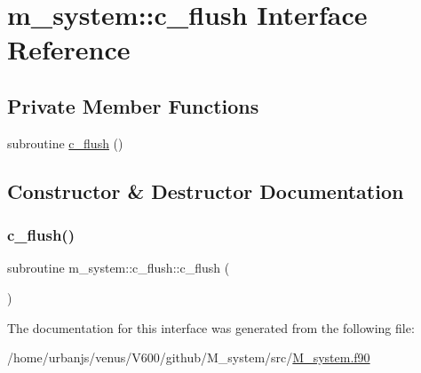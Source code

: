 \hypertarget{interfacem__system_1_1c__flush}{}\section{m\+\_\+system\+:\+:c\+\_\+flush Interface Reference}
\label{interfacem__system_1_1c__flush}
\subsection*{Private Member Functions}
\begin{DoxyCompactItemize}
\item 
subroutine \mbox{\hyperlink{interfacem__system_1_1c__flush_a617b08895c68af8e223aa02cf3a1e30f}{c\+\_\+flush}} ()
\end{DoxyCompactItemize}


\subsection{Constructor \& Destructor Documentation}
\mbox{\label{interfacem__system_1_1c__flush_a617b08895c68af8e223aa02cf3a1e30f}} 
\subsubsection{\texorpdfstring{c\+\_\+flush()}{c\_flush()}}
{\footnotesize\ttfamily subroutine m\+\_\+system\+::c\+\_\+flush\+::c\+\_\+flush (\begin{DoxyParamCaption}{ }\end{DoxyParamCaption})\hspace{0.3cm}{\ttfamily [private]}}



The documentation for this interface was generated from the following file\+:\begin{DoxyCompactItemize}
\item 
/home/urbanjs/venus/\+V600/github/\+M\+\_\+system/src/\mbox{\hyperlink{M__system_8f90}{M\+\_\+system.\+f90}}\end{DoxyCompactItemize}
